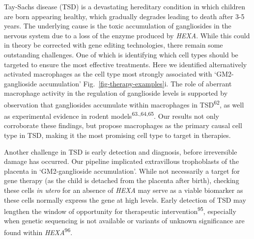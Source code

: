 \documentclass[
]{article}
\begin{document}
Tay-Sachs disease (TSD) is a devastating hereditary condition in which
children are born appearing healthy, which gradually degrades leading to
death after 3-5 years. The underlying cause is the toxic accumulation of
gangliosides in the nervous system due to a loss of the enzyme produced
by \emph{HEXA}. While this could in theory be corrected with gene
editing technologies, there remain some outstanding challenges. One of
which is identifying which cell types should be targeted to ensure the
most effective treatments. Here we identified alternatively activated
macrophages as the cell type most strongly associated with
`GM2-ganglioside accumulation' Fig.~\ref{fig-therapy-examples}i. The
role of aberrant macrophage activity in the regulation of ganglioside
levels is supported by observation that gangliosides accumulate within
macrophages in TSD\textsuperscript{62}, as well as experimental evidence
in rodent models\textsuperscript{63.,64,65}. Our results not only
corroborate these findings, but propose macrophages as the primary
causal cell type in TSD, making it the most promising cell type to
target in therapies.

Another challenge in TSD is early detection and diagnosis, before
irreversible damage has occurred. Our pipeline implicated extravillous
trophoblasts of the placenta in `GM2-ganglioside accumulation'. While
not necessarily a target for gene therapy (as the child is detached from
the placenta after birth), checking these cells \emph{in utero} for an
absence of \emph{HEXA} may serve as a viable biomarker as these cells
normally express the gene at high levels. Early detection of TSD may
lengthen the window of opportunity for therapeutic
intervention\textsuperscript{95}, especially when genetic sequencing is
not available or variants of unknown significance are found within
\emph{HEXA}\textsuperscript{96}.
\end{document}
